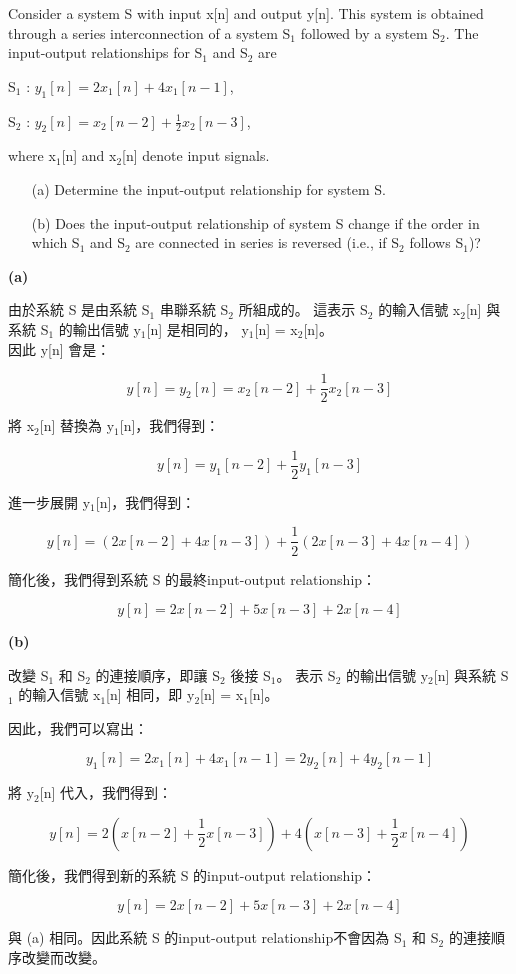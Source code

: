 \documentclass[12pt,a4paper]{article}
\begin{document}
\parbox[t]{\dimexpr\linewidth-\question}{
  Consider a system S with input x[n] and output y[n]. This system is obtained through a series interconnection of a system S\(_1\) followed by a system S\(_2\). The input-output relationships for S\(_1\) and S\(_2\) are

  S\(_1\) : \(y_1[n] = 2x_1[n] + 4x_1[n - 1]\),
  
  S\(_2\) : \(y_2[n] = x_2[n - 2] + \frac{1}{2}x_2[n - 3]\),
  
  where x\(_1\)[n] and x\(_2\)[n] denote input signals.
  \noindent \begin{itemize}
    \item[(a)] Determine the input-output relationship for system S.
    \item[(b)] Does the input-output relationship of system S change if the order in which S\(_1\) and S\(_2\) are connected in series is reversed (i.e., if S\(_2\) follows S\(_1\))?
  \end{itemize}
}


{\bf (a)} 
\parbox[t]{\dimexpr\linewidth-\question} {
由於系統 S 是由系統 S\(_1\) 串聯系統 S\(_2\) 所組成的。
這表示 S\(_2\) 的輸入信號 x\(_2\)[n]  
與系統 S\(_1\) 的輸出信號 y\(_1\)[n] 是相同的， y\(_1\)[n] = x\(_2\)[n]。
\\因此 y[n] 會是：

\[
y[n] = y_2[n] = x_2[n - 2] + \frac{1}{2}x_2[n - 3]
\]

將 x\(_2\)[n] 替換為 y\(_1\)[n]，我們得到：

\[
y[n] = y_1[n - 2] + \frac{1}{2}y_1[n - 3]
\]

進一步展開 y\(_1\)[n]，我們得到：

\[
y[n] = (2x[n - 2] + 4x[n - 3]) + \frac{1}{2}(2x[n - 3] + 4x[n - 4])
\]

簡化後，我們得到系統 S 的最終input-output relationship：

\[
y[n] = 2x[n - 2] + 5x[n - 3] + 2x[n - 4]
\]
}

{\bf (b)} 
\parbox[t]{\dimexpr\linewidth-\question} {
改變 S\(_1\) 和 S\(_2\) 的連接順序，即讓 S\(_2\) 後接 S\(_1\)。
表示 S\(_2\) 的輸出信號 y\(_2\)[n] 
與系統 S\(_1\) 的輸入信號 x\(_1\)[n] 相同，即 y\(_2\)[n] = x\(_1\)[n]。

因此，我們可以寫出：

\[
y_1[n] = 2x_1[n] + 4x_1[n - 1] = 2y_2[n] + 4y_2[n - 1]
\]

將 y\(_2\)[n] 代入，我們得到：

\[
y[n] = 2(x[n - 2] + \frac{1}{2}x[n - 3]) + 4(x[n - 3] + \frac{1}{2}x[n - 4])
\]

簡化後，我們得到新的系統 S 的input-output relationship：

\[
y[n] = 2x[n - 2] + 5x[n - 3] + 2x[n - 4]
\]

與 (a) 相同。因此系統 S 的input-output relationship不會因為 S\(_1\) 和 S\(_2\) 的連接順序改變而改變。
}
\end{document}
